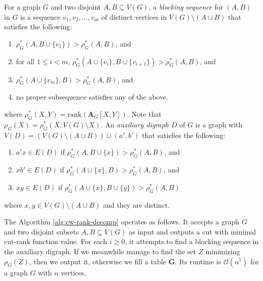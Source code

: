 For a graph $G$ and two disjoint $A,B \subseteq V(G)$, a {\em blocking sequence} for $(A,B)$ in $G$ is a sequence $v_1, v_2, ..., v_m$ of distinct vertices in $V(G) \setminus (A \cup B)$ that satisfies the following:
\begin{enumerate}
	\item $\rho^*_G(A, B \cup \{v_1\}) > \rho_G^*(A,B)$, and
	\item for all $1 \leq i < m$, $\rho^*_G(A \cup \{v_i\}, B \cup \{v_{i+1}\}) > \rho_G^*(A,B)$, and
	\item $\rho^*_G(A \cup \{v_m\}, B) > \rho_G^*(A,B)$, and
	\item no proper subsequence satisfies any of the above.
\end{enumerate}
where $\rho_G^*(X,Y) = \text{rank}(\mathbf{A}_G[X,Y])$. Note that $\rho_G(X) = \rho_G^*(X, V(G) \setminus X)$.
An {\em auxiliary digraph} $D$ of $G$ is a graph with $V(D) = (V(G)\setminus (A\cup B)) \cup (a',b')$ that satisfies the following:
\begin{enumerate}
	\item $a'x \in E(D)$ if $\rho_G^*(A, B \cup \{x\}) > \rho_G^*(A,B)$, and
	\item $xb' \in E(D)$ if $\rho_G^*(A \cup \{x\}, B) > \rho_G^*(A,B)$, and
	\item $xy \in E(D)$ if $\rho_G^*(A \cup \{x\}, B \cup \{y\}) > \rho_G^*(A,B)$
\end{enumerate}
where $x,y \in V(G) \setminus (A \cup B)$ and they are distinct.

The Algorithm \ref{alg:cw-rank-decomp} operates as follows.
It accepts a graph $G$ and two disjoint subsets $A,B \subseteq V(G)$ as input and outputs a cut with minimal cut-rank function value.
For each $i \geq 0$, it attempts to find a blocking sequence in the auxiliary digraph.
If we meanwhile manage to find the set $Z$ minimizing $\rho_G(Z)$, then we output it, otherwise we fill a table \textbf{G}.
Its runtime is $\mathcal{O}(n^5)$ for a graph $G$ with $n$ vertices.

